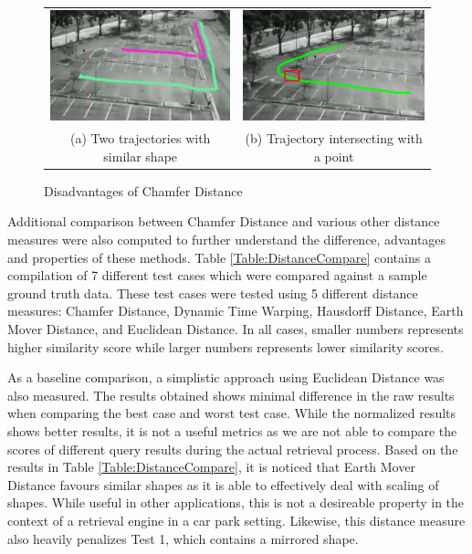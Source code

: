 \begin{figure}[htb!]
  \centering
\begin{tabular}{cc }
 \includegraphics[width=0.45\linewidth]{image/retrievalTwo/chamferDisadv2.png} &
 \includegraphics[width=0.45\linewidth]{image/retrievalTwo/chamferDisadv1.png} \\
 (a) Two trajectories with similar shape &
 (b) Trajectory intersecting with a point \\
\end{tabular}
\caption{Disadvantages of Chamfer Distance} \label{fig:chamferDisadvantage}
\end{figure}


Additional comparison between Chamfer Distance and various other distance measures were also computed to further understand the difference, advantages and properties of these methods. Table \ref{Table:DistanceCompare} contains a compilation of 7 different test cases which were compared against a sample ground truth data. These test cases were tested using 5 different distance measures: Chamfer Distance, Dynamic Time Warping, Hausdorff Distance, Earth Mover Distance, and Euclidean Distance.
In all cases, smaller numbers represents higher similarity score while larger numbers represents lower similarity scores.

As a baseline comparison, a simplistic approach using Euclidean Distance was also measured. The results obtained shows minimal difference in the raw results when comparing the best case and worst test case. While the normalized results shows better results, it is not a useful metrics as we are not able to compare the scores of different query results during the actual retrieval process.
Based on the results in Table \ref{Table:DistanceCompare}, it is noticed that Earth Mover Distance favours similar shapes as it is able to effectively deal with scaling of shapes. While useful in other applications, this is not a desireable property in the context of a retrieval engine in a car park setting. Likewise, this distance measure also heavily penalizes Test 1, which contains a mirrored shape.

